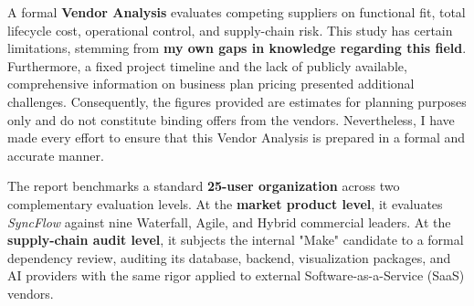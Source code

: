 \vspace{2mm}

A formal \textbf{Vendor Analysis} evaluates competing suppliers on functional fit, total lifecycle cost, operational control, and supply-chain risk. This study has certain limitations, stemming from \textbf{my own gaps in knowledge regarding this field}. Furthermore, a fixed project timeline and the lack of publicly available, comprehensive information on business plan pricing presented additional challenges. Consequently, the figures provided are estimates for planning purposes only and do not constitute binding offers from the vendors. Nevertheless, I have made every effort to ensure that this Vendor Analysis is prepared in a formal and accurate manner.

\vspace{2mm}

The report benchmarks a standard \textbf{25-user organization} across two complementary evaluation levels. At the \textbf{market product level}, it evaluates \textit{SyncFlow} against nine Waterfall, Agile, and Hybrid commercial leaders. At the \textbf{supply-chain audit level}, it subjects the internal "Make" candidate to a formal dependency review, auditing its database, backend, visualization packages, and AI providers with the same rigor applied to external Software-as-a-Service (SaaS) vendors.
